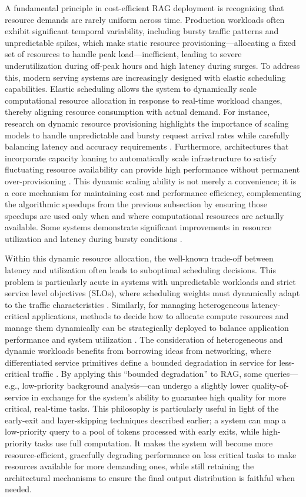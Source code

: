 \documentclass[11pt]{article}
\begin{document}
A fundamental principle in cost-efficient RAG deployment is recognizing that resource demands are rarely uniform across time. Production workloads often exhibit significant temporal variability, including bursty traffic patterns and unpredictable spikes, which make static resource provisioning---allocating a fixed set of resources to handle peak load---inefficient, leading to severe underutilization during off-peak hours and high latency during surges. To address this, modern serving systems are increasingly designed with elastic scheduling capabilities. Elastic scheduling allows the system to dynamically scale computational resource allocation in response to real-time workload changes, thereby aligning resource consumption with actual demand. For instance, research on dynamic resource provisioning highlights the importance of scaling models to handle unpredictable and bursty request arrival rates while carefully balancing latency and accuracy requirements \cite{ref338}. Furthermore, architectures that incorporate capacity loaning to automatically scale infrastructure to satisfy fluctuating resource availability can provide high performance without permanent over-provisioning \cite{ref339}. This dynamic scaling ability is not merely a convenience; it is a core mechanism for maintaining cost and performance efficiency, complementing the algorithmic speedups from the previous subsection by ensuring those speedups are used only when and where computational resources are actually available. Some systems demonstrate significant improvements in resource utilization and latency during bursty conditions \cite{ref340}.

Within this dynamic resource allocation, the well-known trade-off between latency and utilization often leads to suboptimal scheduling decisions. This problem is particularly acute in systems with unpredictable workloads and strict service level objectives (SLOs), where scheduling weights must dynamically adapt to the traffic characteristics \cite{ref341}. Similarly, for managing heterogeneous latency-critical applications, methods to decide how to allocate compute resources and manage them dynamically can be strategically deployed to balance application performance and system utilization \cite{ref342}. The consideration of heterogeneous and dynamic workloads benefits from borrowing ideas from networking, where differentiated service primitives define a bounded degradation in service for less-critical traffic \cite{ref343}. By applying this ``bounded degradation'' to RAG, some queries---e.g., low-priority background analysis---can undergo a slightly lower quality-of-service in exchange for the system's ability to guarantee high quality for more critical, real-time tasks. This philosophy is particularly useful in light of the early-exit and layer-skipping techniques described earlier; a system can map a low-priority query to a pool of tokens processed with early exits, while high-priority tasks use full computation. It makes the system will become more resource-efficient, gracefully degrading performance on less critical tasks to make resources available for more demanding ones, while still retaining the architectural mechanisms to ensure the final output distribution is faithful when needed.
\end{document}
